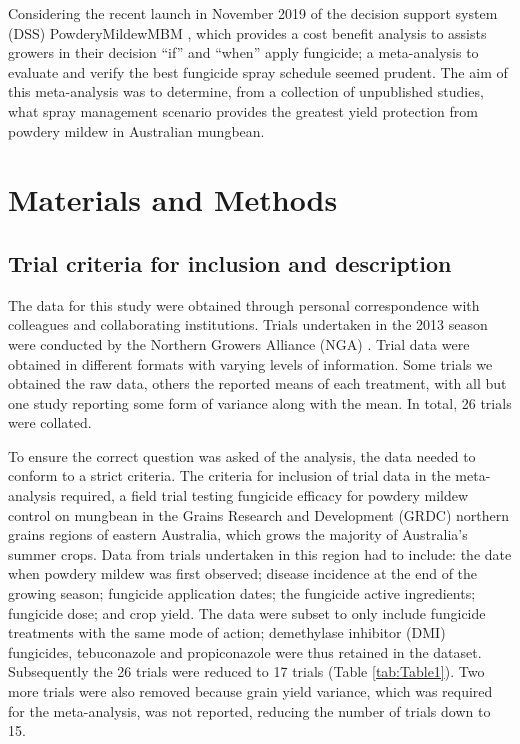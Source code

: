 \documentclass[agronomy,article,submit,moreauthors,pdftex]{mdpi}
\begin{document}
Considering the recent launch in November 2019 of the decision support system (DSS) PowderyMildewMBM \citep{Diggle}, which provides a cost benefit analysis to assists growers in their decision ``if'' and ``when'' apply fungicide; a meta-analysis to evaluate and verify the best fungicide spray schedule seemed prudent.
The aim of this meta-analysis was to determine, from a collection of unpublished studies, what spray management scenario provides the greatest yield protection from powdery mildew in Australian mungbean.

\hypertarget{materials-and-methods}{%
\section{Materials and Methods}\label{materials-and-methods}}

\hypertarget{trial-criteria-for-inclusion-and-description}{%
\subsection{Trial criteria for inclusion and description}\label{trial-criteria-for-inclusion-and-description}}

The data for this study were obtained through personal correspondence with colleagues and collaborating institutions.
Trials undertaken in the 2013 season were conducted by the Northern Growers Alliance (NGA) \citetext{\citeyear{goolhi2013}; \citeyear{premer2013}; \citeyear{Millmerran2013}; \citeyear{Marysmount2013}}.
Trial data were obtained in different formats with varying levels of information.
Some trials we obtained the raw data, others the reported means of each treatment, with all but one study reporting some form of variance along with the mean.
In total, 26 trials were collated.

To ensure the correct question was asked of the analysis, the data needed to conform to a strict criteria.
The criteria for inclusion of trial data in the meta-analysis required, a field trial testing fungicide efficacy for powdery mildew control on mungbean in the Grains Research and Development (GRDC) northern grains regions of eastern Australia, which grows the majority of Australia's summer crops.
Data from trials undertaken in this region had to include: the date when powdery mildew was first observed; disease incidence at the end of the growing season; fungicide application dates; the fungicide active ingredients; fungicide dose; and crop yield.
The data were subset to only include fungicide treatments with the same mode of action; demethylase inhibitor (DMI) fungicides, tebuconazole and propiconazole were thus retained in the dataset.
Subsequently the 26 trials were reduced to 17 trials (Table \ref{tab:Table1}).
Two more trials were also removed because grain yield variance, which was required for the meta-analysis, was not reported, reducing the number of trials down to 15.
\end{document}
